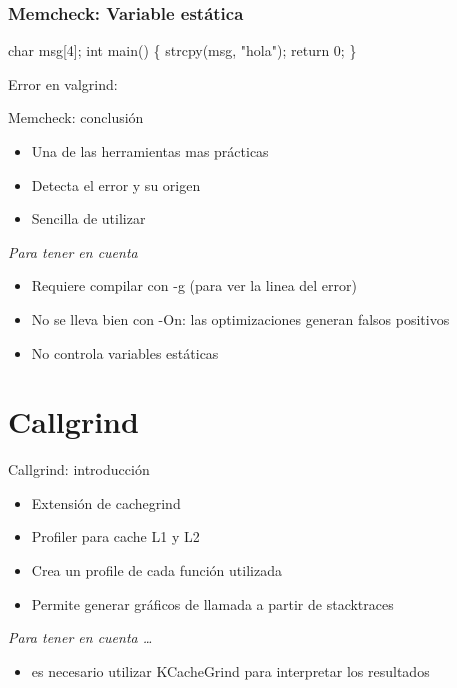 \documentclass{beamer}
\begin{document}
\begin{frame}[fragile, shrink=25]
\frametitle{Memcheck: Variable est\'atica}
\begin{semiverbatim}
char msg[4];
int main() \{
  strcpy(msg, "hola");
  return 0;
\}
\end{semiverbatim}

Error en valgrind:
\begin{center}
\end{center}
\end{frame}

\begin{frame}{Memcheck: conclusi\'on}
\begin{itemize}
  \item Una de las herramientas mas pr\'acticas
  \item Detecta el error y su origen
  \item Sencilla de utilizar
\end{itemize}
\textit{Para tener en cuenta}
\begin{itemize}
  \item Requiere compilar con -g (para ver la linea del error)
  \item No se lleva bien con -On: las optimizaciones generan falsos positivos
  \item No controla variables est\'aticas
\end{itemize}
\end{frame}



\section{Callgrind}

\begin{frame}{Callgrind: introducci\'on}
\begin{itemize}
  \item Extensi\'on de cachegrind
  \item Profiler para cache L1 y L2
  \item Crea un profile de cada funci\'on utilizada
  \item Permite generar gr\'aficos de llamada a partir de stacktraces
\end{itemize}
\rule{0em}{40pt}
\textit{ Para tener en cuenta \ldots }
\begin{itemize}
  \item es necesario utilizar KCacheGrind para interpretar los resultados
\end{itemize}
\end{frame}
\end{document}
